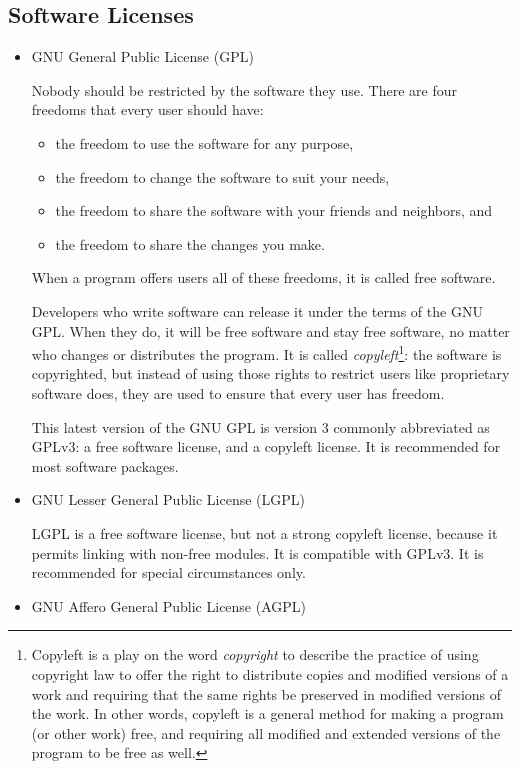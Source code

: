 \subsection{Software Licenses}
\begin{itemize}
\item GNU General Public License (GPL)

Nobody should be restricted by the software they use. There are four freedoms that every user should have:
	\begin{itemize}
    \item the freedom to use the software for any purpose,
    \item the freedom to change the software to suit your needs,
    \item the freedom to share the software with your friends and neighbors, and
    \item the freedom to share the changes you make.
	\end{itemize}
When a program offers users all of these freedoms, it is called free software.

Developers who write software can release it under the terms of the GNU GPL. When they do, it will be free software and stay free software, no matter who changes or distributes the program. It is called \emph{copyleft}\footnote{Copyleft is a play on the word \emph{copyright} to describe the practice of using copyright law to offer the right to distribute copies and modified versions of a work and requiring that the same rights be preserved in modified versions of the work. In other words, copyleft is a general method for making a program (or other work) free, and requiring all modified and extended versions of the program to be free as well.\textsuperscript{\cite{copyleft}}}: the software is copyrighted, but instead of using those rights to restrict users like proprietary software does, they are used to ensure that every user has freedom.

This latest version of the GNU GPL is version 3 commonly abbreviated as GPLv3: a free software license, and a copyleft license. It is recommended for most software packages.

\item GNU Lesser General Public License (LGPL)

LGPL is a free software license, but not a strong copyleft license, because it permits linking with non-free modules. It is compatible with GPLv3. It is recommended for special circumstances only.

\item GNU Affero General Public License (AGPL) 


\end{itemize}
